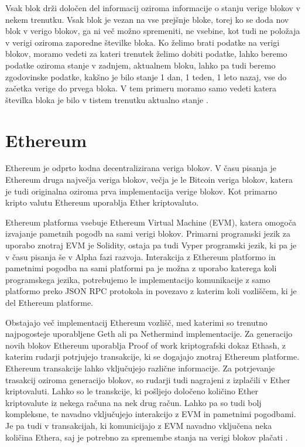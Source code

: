 \documentclass[a4paper,12pt,openright]{book}
\begin{document}
Vsak blok drži določen del informacij oziroma informacije o stanju verige blokov v nekem trenutku.
Vsak blok je vezan na vse prejšnje bloke, torej ko se doda nov blok v verigo blokov, ga ni več možno spremeniti, ne vsebine, kot tudi ne položaja v verigi oziroma zaporedne številke bloka.
Ko želimo brati podatke na verigi blokov, moramo vedeti za kateri trenutek želimo dobiti podatke, lahko beremo podatke oziroma stanje v zadnjem, aktualnem bloku, 
lahko pa tudi beremo zgodovinske podatke, kakšno je bilo stanje 1 dan, 1 teden, 1 leto nazaj, vse do začetka verige do prvega bloka.
V tem primeru moramo samo vedeti katera številka bloka je bilo v tistem trenutku aktualno stanje \cite{blockchain_explained_investopedia}.

\section{Ethereum}
Ethereum je odprto kodna decentralizirana veriga blokov.
V času pisanja je Ethereum druga največja veriga blokov, večja je le Bitcoin veriga blokov, katera je tudi originalna oziroma prva implementacija verige blokov.
Kot primarno kripto valutu Ethereum uporablja Ether kriptovaluto.

Ethereum platforma vsebuje Ethereum Virtual Machine (EVM), katera omogoča izvajanje pametnih pogodb na sami verigi blokov.
Primarni programski jezik za uporabo znotraj EVM je Solidity, ostaja pa tudi Vyper programski jezik, ki pa je v času pisanja še v Alpha fazi razvoja.
Interakcija z Ethereum platformo in pametnimi pogodba na sami platformi pa je možna z uporabo katerega koli programskega jezika, potrebujemo le implementacijo komunikacije z samo platformo preko JSON RPC protokola in povezavo z katerim koli vozliščem, ki je del Ethereum platforme.

Obstajajo več implementacij Ethereum vozlišč, med katerimi so trenutno najpogosteje uporabljene Geth ali pa Nethermind implementacije.
Za generacijo novih blokov Ethereum uporablja Proof of work kriptografski dokaz Ethash, z katerim rudarji potrjujejo transakcije, ki se dogajajo znotraj Ethereum platforme. 
Ethereum transakcije lahko vključujejo različne informacije. 
Za potrjevanje trasakcij oziroma generacijo blokov, so rudarji tudi nagrajeni z izplačili v Ether kriptovaluti.
Lahko so le transkcije, ki pošljejo določeno količino Ether kriptovalute iz nekega računa na nek drug račun.
Lahko pa so tudi bolj kompleksne, te navadno vključujejo interakcijo z EVM in pametnimi pogodbami.
Je pa tudi v transakcijah, ki komunicijajo z EVM navadno vključena neka količina Ethera, saj je potrebno za spremembe stanja na verigi blokov plačati \cite{ethereum_whitepaper}.
\end{document}
